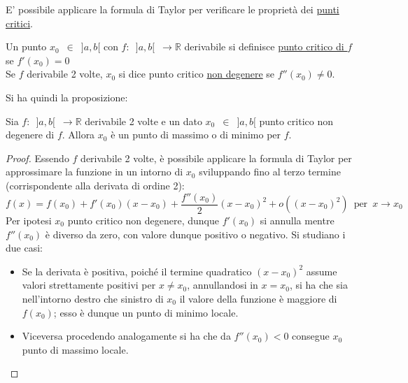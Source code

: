 \documentclass[10pt]{article}
\theoremstyle{plain}
\begin{document}
E' possibile applicare la formula di Taylor per verificare le proprietà dei \hyperlink{critici}{punti critici}.

\begin{defin}
Un punto $x_0 \enspace \in \enspace ]a, b[$ con $f : \enspace ]a, b[ \enspace \rightarrow \mathbb{R}$ derivabile si definisce \underline{punto critico di $f$} se $f'(x_0) = 0$\\
Se $f$ derivabile 2 volte, $x_0$ si dice punto critico \underline{non degenere} se $f''(x_0) \neq 0$.
\end{defin}
Si ha quindi la proposizione:
\begin{prop}
Sia $f : \enspace ]a, b[ \enspace \rightarrow \mathbb{R}$ derivabile 2 volte e un dato $x_0 \enspace \in \enspace ]a, b[$ punto critico non degenere di $f$. Allora $x_0$ è un punto di massimo o di minimo per $f$.
\end{prop}
\begin{proof}
Essendo $f$ derivabile 2 volte, è possibile applicare la formula di Taylor per approssimare la funzione in un intorno di $x_0$ sviluppando fino al terzo termine (corrispondente alla derivata di ordine 2):
\[f(x) = f(x_0) + f'(x_0)(x-x_0) + \frac{f''(x_0)}{2}(x-x_0)^2 + o((x-x_0)^2) \enspace \textrm{per} \enspace x \rightarrow x_0\]
Per ipotesi $x_0$ punto critico non degenere, dunque $f'(x_0)$ si annulla mentre $f''(x_0)$ è diverso da zero, con valore dunque positivo o negativo. Si studiano i due casi:
\begin{itemize}[label=$\star$]
    \item Se la derivata è positiva, poiché il termine quadratico $(x-x_0)^2$ assume valori strettamente positivi per $x \neq x_0$, annullandosi in $x = x_0$, si ha che sia nell'intorno destro che sinistro di $x_0$ il valore della funzione è maggiore di $f(x_0)$; esso è dunque un punto di minimo locale.
    \item Viceversa procedendo analogamente si ha che da $f''(x_0) < 0$ consegue $x_0$ punto di massimo locale.
\end{itemize}
\end{proof}
\end{document}
